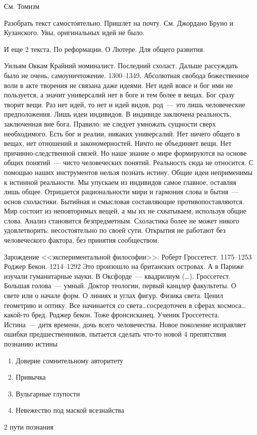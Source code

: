 См. Томизм

Разобрать текст самостоятельно. Пришлет на почту. См. Джордано Бруно и Кузанского. Увы, оригинальных идей не было.

И еще 2 текста. По реформации. О Лютере. Для общего развития.

Уильям Оккам
Крайний номиналист. Последний схоласт. Дальше рассуждать было не очень, самоуничтожение. 1300--1349.
Абсолютная свобода божественное воли в акте творения не связана даже идеями. Нет идей вовсе и бог ими не пользуется, а значит универсалий нет в боге и тем более в вещах. Бог сразу творит вещи. Раз нет идей, то нет и идей видов, род~--- это лишь человеческие предположения. Лишь идеи индивидов. В индивиде заключена реальность, заключенная вне бога. Правило: не следует умножать сущности сверх необходимого. Есть бог и реалии, никаких универсалий. Нет ничего общего в вещах, нет отношений и закономерностей. Ничто не объединяет вещи. Нет причинно-следственной связей. Но наше знание о мире формируются на основе общих понятий~--- чисто человеческих понятий. Реальность сюда не относится. С помощью наших инструментов нельзя познать истину. Общие идеи неприменимы к истинной реальности. Мы упускаем из индивидов самое главное, оставляя лишь общее. Отрицается рациональности мири и гармония слова и бытия~--- основ схоластики. Бытийная и смысловая составляющие противопоставляются. Мир состоит из неповторимых вещей, а мы их не схватываем, используя общие слова. Анализ становится безпредметным. Схоластика более не может никого удовлетворить: несостоятельно по своей сути.
Открытия не работают без человеческого фактора, без принятия сообществом.

Зарождение <<экспериментальной философии>>.
Роберт Гроссетест. 1175--1253
Роджер Бекон. 1214--1292
Это произошло на британских островах. А в Париже изучали гуманитарные науки. В Оксфорде~--- квадрилиум (\ldots). 
Гроссетест. Большая голова~--- умный. Доктор теологии, первый канцлер факультеты. О свете или о начале форм. О линиях и углах фигур. Физика света. Ценил геометрию и оптику. Все начинается со света\ldots сосредоточен в сферах космоса\ldots какой-то бред.
Роджер бекон. Тоже фронсисканец. Ученик Гроссетеста. Истина~--- дитя времени, дочь всего человечества. Новое поколение исправляет ошибки предшественников, пытается сделать что-то новой
4 препятствия познанию истины

\begin{enumerate}
	\item Доверие сомнительному авторитету
	\item Привычка
	\item Вульгарные глупости
	\item Невежество под маской всезнайства
\end{enumerate}
2 пути познания

